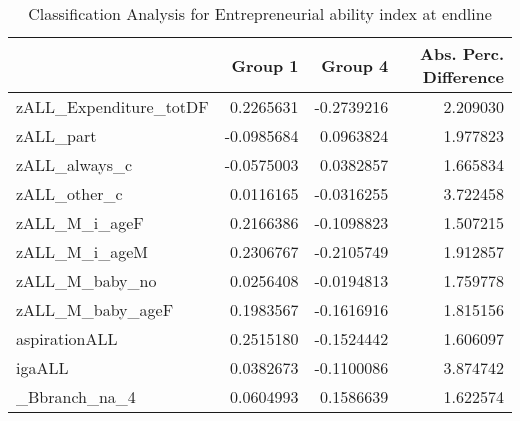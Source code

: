 \begin{table}

\caption{\label{tab:clanQEntrep_total}Classification Analysis for Entrepreneurial ability index at endline}
\centering
\begin{tabular}[t]{lrrr}
\toprule
  & Group 1 & Group 4 & Abs. Perc. Difference\\
\midrule
zALL\_Expenditure\_totDF & 0.2265631 & -0.2739216 & 2.209030\\
zALL\_part & -0.0985684 & 0.0963824 & 1.977823\\
zALL\_always\_c & -0.0575003 & 0.0382857 & 1.665834\\
zALL\_other\_c & 0.0116165 & -0.0316255 & 3.722458\\
zALL\_M\_i\_ageF & 0.2166386 & -0.1098823 & 1.507215\\
\addlinespace
zALL\_M\_i\_ageM & 0.2306767 & -0.2105749 & 1.912857\\
zALL\_M\_baby\_no & 0.0256408 & -0.0194813 & 1.759778\\
zALL\_M\_baby\_ageF & 0.1983567 & -0.1616916 & 1.815156\\
aspirationALL & 0.2515180 & -0.1524442 & 1.606097\\
igaALL & 0.0382673 & -0.1100086 & 3.874742\\
\addlinespace
\_Bbranch\_na\_4 & 0.0604993 & 0.1586639 & 1.622574\\
\bottomrule
\end{tabular}
\end{table}
